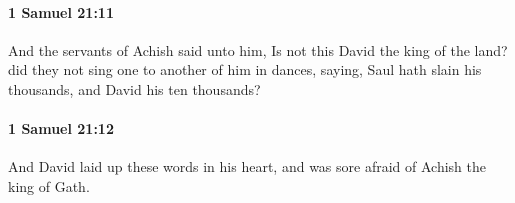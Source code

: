 		\paragraph{1 Samuel 21:11} %
			\label{1SAMUEL-21-11}

			And the servants of Achish said unto him, Is not this David the king of the land? did they not sing one to another of him in dances, saying, Saul hath slain his thousands, and David his ten thousands?


		\paragraph{1 Samuel 21:12} %
			\label{1SAMUEL-21-12}

			And David laid up these words in his heart, and was sore afraid of Achish the king of Gath.


